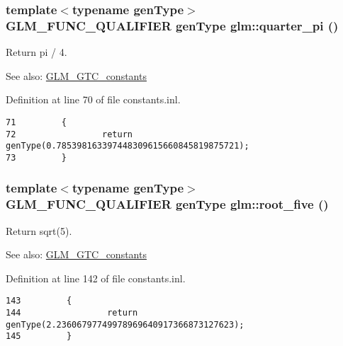 \hypertarget{group__gtc__constants_g42880986550674518989d057ee8b6407}{
\subsubsection[quarter\_\-pi]{\setlength{\rightskip}{0pt plus 5cm}template$<$typename genType$>$ GLM\_\-FUNC\_\-QUALIFIER genType glm::quarter\_\-pi ()}}
\label{group__gtc__constants_g42880986550674518989d057ee8b6407}


Return pi / 4. \begin{Desc}
\item[See also:]\hyperlink{group__gtc__constants}{GLM\_\-GTC\_\-constants} \end{Desc}


Definition at line 70 of file constants.inl.

\begin{Code}\begin{verbatim}71         {
72                 return genType(0.785398163397448309615660845819875721);
73         }
\end{verbatim}
\end{Code}


\hypertarget{group__gtc__constants_gfa2f8c1bc0e6684652171820d9140d3e}{
\subsubsection[root\_\-five]{\setlength{\rightskip}{0pt plus 5cm}template$<$typename genType$>$ GLM\_\-FUNC\_\-QUALIFIER genType glm::root\_\-five ()}}
\label{group__gtc__constants_gfa2f8c1bc0e6684652171820d9140d3e}


Return sqrt(5). \begin{Desc}
\item[See also:]\hyperlink{group__gtc__constants}{GLM\_\-GTC\_\-constants} \end{Desc}


Definition at line 142 of file constants.inl.

\begin{Code}\begin{verbatim}143         {
144                 return genType(2.23606797749978969640917366873127623);
145         }
\end{verbatim}
\end{Code}


